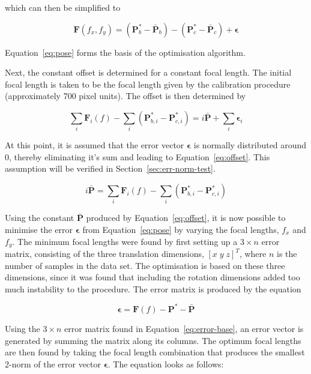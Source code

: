 which can then be simplified to 

\begin{equation}
  \label{eq:pose}
  \bm{F}(f_x, f_y) = (\bm{P}^*_b - \bar{\bm{P}}_b) - (\bm{P}^*_c - \bar{\bm{P}}_c) + \bm{\epsilon}
\end{equation}

Equation~\ref{eq:pose} forms the basis of the optimisation algorithm.

Next, the constant offset is determined for a constant focal length. The initial focal length is taken to be the focal length given by the calibration procedure (approximately 700 pixel units). The offset is then determined by 

\[
  \sum\limits_i \bm{F}_i(f) - \sum\limits_i(\bm{P}^*_{b,i} - \bm{P}^*_{c, i}) = i\bar{\bm{P}} + \sum\limits_i\bm{\epsilon}_i
\]

At this point, it is assumed that the error vector $\bm{\epsilon}$ is normally distributed around $0$, thereby eliminating it's sum and leading to Equation~\ref{eq:offset}. This assumption will be verified in Section~\ref{sec:err-norm-test}. 

\begin{equation}
  \label{eq:offset}
  i\bar{\bm{P}} = \sum\limits_i \bm{F}_i(f) - \sum\limits_i(\bm{P}^*_{b,i} - \bm{P}^*_{c, i})
\end{equation}

Using the constant $\bar{\bm{P}}$ produced by Equation~\ref{eq:offset}, it is now possible to minimise the error $\bm{\epsilon}$ from Equation~\ref{eq:pose} by varying the focal lengths, $f_x$ and $f_y$. The minimum focal lengths were found by first setting up a $3\times n$ error matrix, consisting of the three translation dimensions, ${[x\;y\;z]}^T$, where $n$ is the number of samples in the data set. The optimisation is based on these three dimensions, since it was found that including the rotation dimensions added too much instability to the procedure. The error matrix is produced by the equation

\begin{equation}
  \label{eq:error-base}
  \bm{\epsilon} = \bm{F}(f) - \bm{P}^* - \bar{\bm{P}}
\end{equation}

Using the $3\times n$ error matrix found in Equation~\ref{eq:error-base}, an error vector is generated by summing the matrix along its columns. The optimum focal lengths are then found by taking the focal length combination that produces the smallest 2-norm of the error vector $\bm{\epsilon}$. The equation looks as follows:

